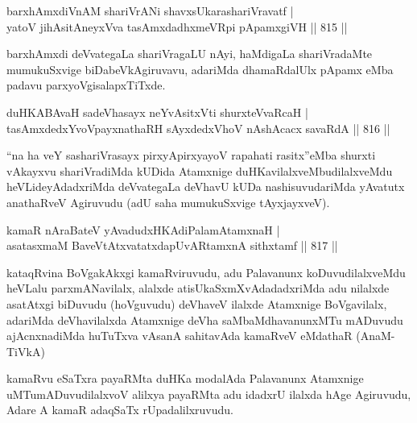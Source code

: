 
\begin{shl}
barxhAmxdiVnAM shariVrANi shavxsUkarashariVravatf | \\
yatoV jihAsitAneyxVva tasAmxdadhxmeVR\s pi pApamxgiVH \hfill||  815 ||  
\end{shl}

\begin{artha}
barxhAmxdi deVvategaLa shariVragaLU nAyi, haMdigaLa shariVradaMte mumukuSxvige biDabeVkAgiruvavu, adariMda dhamaRdalUlx pApamx eMba padavu parxyoVgisalapxTiTxde.
\end{artha}


\begin{shl}
duHKABAvaH sadeVhasayx neYvAsitxVti shurxteVvaRcaH | \\
tasAmxdedxYvoV\s payxnathaRH sAyxdedxVhoV nAshAcacx savaRdA \hfill||  816 ||  
\end{shl}

\begin{artha}
``na ha veY sashariVrasayx pirxyApirxyayoV rapahati rasitx''eMba shurxti vAkayxvu shariVradiMda kUDida Atamxnige duHKavilalxveMbudilalxveMdu heVLideyAdadxriMda deVvategaLa deVhavU kUDa nashisuvudariMda yAvatutx anathaRveV Agiruvudu (adU saha mumukuSxvige tAyxjayxveV).
\end{artha}


\begin{shl}
kamaR nA\s \s raBateV yAvadudxHKAdiPalamAtamxnaH | \\
asatasxmaM BaveVtAtxvatatxdapUvARtamxnA sithxtamf \hfill||  817 ||  
\end{shl}

\begin{artha}
kataqRvina BoVgakAkxgi kamaRviruvudu, adu Palavanunx koDuvudilalxveMdu heVLalu parxmANavilalx, alalxde atisUkaSxmXvAdadadxriMda adu nilalxde asatAtxgi biDuvudu (hoVguvudu) deVhaveV ilalxde Atamxnige BoVgavilalx, adariMda deVhavilalxda Atamxnige deVha saMbaMdhavanunxMTu mADuvudu ajAcnxnadiMda huTuTxva vAsanA sahitavAda kamaRveV eMdathaR (AnaM-TiVkA)
\end{artha}

\begin{artha}
kamaRvu eSaTxra payaRMta duHKa modalAda Palavanunx Atamxnige uMTumADuvudilalxvoV alilxya payaRMta adu idadxrU ilalxda hAge Agiruvudu, Adare A kamaR adaqSaTx rUpadalilxruvudu.
\end{artha}

